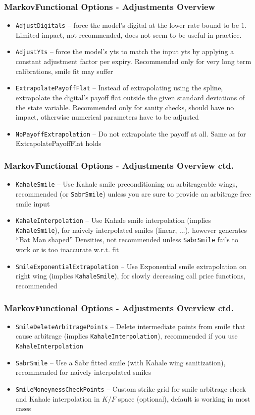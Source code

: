 \documentclass{beamer}
\begin{document}
\begin{frame}[fragile]
\frametitle{MarkovFunctional Options - Adjustments Overview}
\begin{itemize}
\item \verb+AdjustDigitals+ -- force the model's digital at the lower rate bound to be $1$.
Limited impact, not recommended, does not seem to be useful in practice.
\item \verb+AdjustYts+ -- force the model's yts to match the input yts by applying a constant
adjustment factor per expiry. Recommended only for very long term calibrations,
smile fit may suffer
\item \verb+ExtrapolatePayoffFlat+ -- Instead of extrapolating using the spline, extrapolate the digital's
payoff flat outside the given standard deviations of the state variable. Recommended only for sanity
checks, should have no impact, otherwise numerical parameters have to be adjusted
\item \verb+NoPayoffExtrapolation+ -- Do not extrapolate the payoff at all. Same as for ExtrapolatePayoffFlat
holds
\end{itemize}
\end{frame}


\begin{frame}[fragile]
\frametitle{MarkovFunctional Options - Adjustments Overview ctd.}
\begin{itemize}
\item \verb+KahaleSmile+ -- Use Kahale smile preconditioning on arbitrageable wings, recommended (or \verb+SabrSmile+) unless
you are sure to provide an arbitrage free smile input
\item \verb+KahaleInterpolation+ -- Use Kahale smile interpolation (implies \verb+KahaleSmile+), for naively interpolated smiles
(linear, ...), however generates ``Bat Man shaped'' Densities, not recommended unless \verb+SabrSmile+ fails to work or is too
inaccurate w.r.t. fit
\item \verb+SmileExponentialExtrapolation+ -- Use Exponential smile extrapolation on right wing (implies \verb+KahaleSmile+),
for slowly decreasing call price functions, recommended
\end{itemize}
\end{frame}

\begin{frame}[fragile]
\frametitle{MarkovFunctional Options - Adjustments Overview ctd.}
\begin{itemize}
\item \verb+SmileDeleteArbitragePoints+ -- Delete intermediate points from smile that cause arbitrage (implies \verb+KahaleInterpolation+),
recommended if you use \verb+KahaleInterpolation+
\item \verb+SabrSmile+ -- Use a Sabr fitted smile (with Kahale wing sanitization), recommended for naively interpolated smiles
\item \verb+SmileMoneynessCheckPoints+ -- Custom strike grid for smile arbitrage check and Kahale interpolation in $K/F$ space (optional),
default is working in most cases
\end{itemize}
\end{frame}
\end{document}
